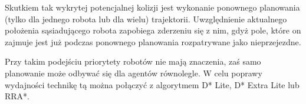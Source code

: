 
Skutkiem tak wykrytej potencjalnej kolizji jest wykonanie ponownego planowania (tylko dla jednego robota lub dla wielu) trajektorii. Uwzględnienie aktualnego położenia sąsiadującego robota zapobiega zderzeniu się z nim, gdyż pole, które on zajmuje jest już podczas ponownego planowania rozpatrywane jako nieprzejezdne.

Przy takim podejściu priorytety robotów nie mają znaczenia, zaś samo planowanie może odbywać się dla agentów równolegle.
W celu poprawy wydajności technikę tą można połączyć z algorytmem D* Lite, D* Extra Lite lub RRA*.
